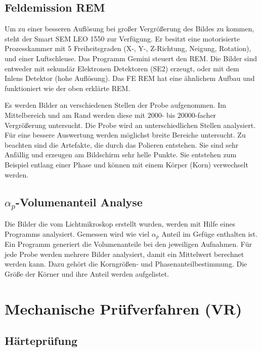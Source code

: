 \subsection{Feldemission REM}
Um zu einer besseren Auflösung bei großer Vergrößerung des Bildes zu kommen, steht der Smart SEM LEO 1550 zur Verfügung. Er besitzt eine motorisierte Prozesskammer mit 5 Freiheitsgraden (X-, Y-, Z-Richtung, Neigung, Rotation), und einer Luftschleuse. Das Programm Gemini steuert den REM. Die Bilder sind entweder mit sekundär Elektronen Detektoren (SE2) erzeugt, oder mit dem Inlens Detektor (hohe Auflösung). Das FE REM hat eine ähnlichem Aufbau und funktioniert wie der oben erklärte REM.

Es werden Bilder an verschiedenen Stellen der Probe aufgenommen. Im Mittelbereich und am Rand werden diese mit 2000- bis 20000-facher Vergrößerung untersucht. Die Probe wird an unterschiedlichen Stellen analysiert. Für eine bessere Auswertung werden möglichst breite Bereiche untersucht. Zu beachten sind die Artefakte, die durch das Polieren entstehen. Sie sind sehr Anfällig und erzeugen am Bildschirm sehr helle Punkte. Sie entstehen zum Beispiel entlang einer Phase und können mit einem Körper (Korn) verwechselt werden.


\subsection{$\alpha_{p}$-Volumenanteil Analyse}

Die Bilder die vom Lichtmikroskop erstellt wurden, werden mit Hilfe eines Programms analysiert. Gemessen wird wie viel $\alpha_{p}$ Anteil im Gefüge enthalten ist. Ein Programm generiert die Volumenanteile bei den jeweiligen Aufnahmen. Für jede Probe werden mehrere Bilder analysiert, damit ein Mittelwert berechnet werden kann. Dazu gehört die Korngrößen- und Phasenanteilbestimmung. Die Größe der Körner und ihre Anteil werden aufgelistet. 


\section{Mechanische Prüfverfahren (VR)}

\subsection{Härteprüfung}

